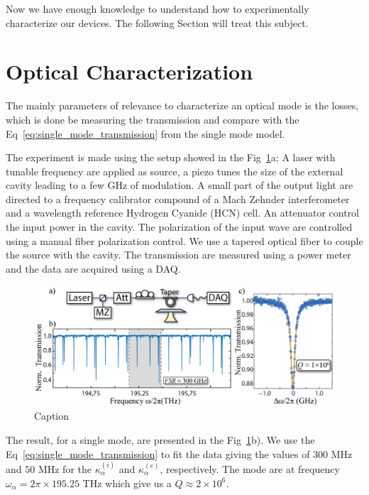 Now we have enough knowledge to understand how to experimentally characterize our devices. The following Section will treat this subject. 

\section{Optical Characterization}

The mainly parameters of relevance to characterize an optical mode is the losses, which is done be measuring the transmission and compare with the Eq~\ref{eq:single_mode_transmission} from the single mode model. 

The experiment is made using the setup showed in the  Fig~\ref{fig:exp_mode_charac}a; A laser with tunable frequency are applied as source, a piezo tunes the size of the external cavity leading to a few GHz of modulation. A small part of the output light are directed to a frequency calibrator compound of a Mach Zehnder interferometer and a wavelength reference Hydrogen Cyanide (HCN) cell. An attenuator control the input power in the cavity. The polarization of the input wave are controlled using a manual fiber polarization control. We use a tapered optical fiber to couple the source with the cavity. The transmission are measured using a power meter and the data are acquired using a DAQ. 
\begin{figure}[h!]
    \centering
    \includegraphics[width = 16cm]{figuras/Dissertation_optical_char_exp.jpg}
    \caption{Caption}
    \label{fig:exp_mode_charac}
\end{figure}

The result, for a single mode, are presented in the Fig~\ref{fig:exp_mode_charac}b). We use the Eq~\ref{eq:single_mode_transmission} to fit the data giving the values of $300$ MHz and $50$ MHz for the $\kappa_\alpha^{(i)}$ and $\kappa_\alpha^{(e)}$, respectively. The mode are at frequency $\omega_\alpha = 2\pi\times195.25$ THz which give us a $Q \approx 2\times10^6$.


